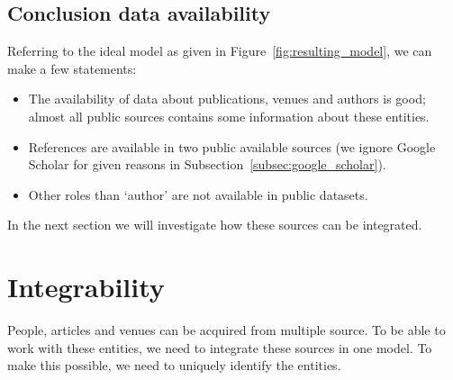 \documentclass{ou-report}
\begin{document}
\subsection{Conclusion data availability}
\label{subsec:ConclusionsDataAvailablity}
Referring to the ideal model as given in Figure~\ref{fig:resulting_model}, we 
can make a few statements:
\begin{itemize}
    \item The availability of data about publications, venues and authors is 
    good; almost all public sources contains some information about these 
    entities. 
    \item References are available in two public available sources (we ignore 
    Google Scholar for given reasons in Subsection~\ref{subsec:google_scholar}).
    \item Other roles than `author' are not available in public datasets.
\end{itemize}

In the next section we will investigate how these sources can be integrated.



\section{Integrability}
\label{sec:data_integrability}
People, articles and venues can be acquired from multiple source. To be able to 
work with these entities, we need to integrate these sources in one model. To 
make this possible, we need to uniquely identify the entities.

\end{document}
